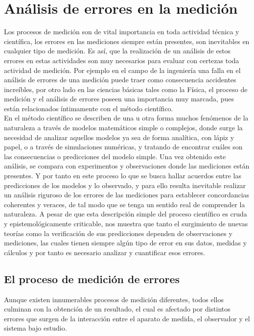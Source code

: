 \chapter{Análisis de errores en la medición}

Los procesos de medición son de vital importancia en toda actividad técnica y científica, los errores en las mediciones siempre 
están presentes, son inevitables en cualquier tipo de medición. Es así, que la realización de un análisis de estos errores en 
estas actividades son muy necesarios para evaluar con certezas toda actividad de medición. Por ejemplo en el campo de la 
ingeniería una falla en el análisis de errores de una medición puede traer como consecuencia accidentes increíbles, por otro lado 
 en las ciencias básicas tales como la Física, el proceso de medición y el análisis de errores poseen una importancia muy 
marcada, pues están relacionados íntimamente con el método científico.\\

En el método científico se describen de una u otra forma muchos fenómenos de la naturaleza a través de modelos matemáticos 
simple o complejos, donde surge la necesidad de analizar aquellos  modelos ya sea de forma analítica, con lápiz y papel, o a 
través de simulaciones numéricas, y tratando de encontrar cuáles son las consecuencias o predicciones del modelo simple. Una vez 
obtenido este análisis, se compara con experimentos y observaciones donde las mediciones están presentes. Y por tanto en este 
proceso lo que se busca hallar acuerdos entre las predicciones de los modelos y lo observado, y para ello resulta inevitable 
realizar un análisis riguroso de los errores de las mediciones para establecer concordancias coherentes y veraces, de tal modo que 
se tenga un sentido real de comprender la naturaleza. A pesar de que esta descripción simple del proceso científico es cruda y 
epistemológicamente criticable, nos muestra que tanto el surgimiento de nuevas teorías como la verificación de sus predicciones 
dependen de observaciones y mediciones, las cuales tienen siempre algún tipo de error en sus datos, medidas y cálculos y por tanto 
es necesario analizar y cuantificar esos errores.

\section{El proceso de medición de errores}

Aunque existen innumerables procesos de medición diferentes, todos ellos culminan con la obtención de un resultado, el cual es 
afectado por distintos errores que surgen de la interacción entre el aparato de medida, el observador y el sistema bajo 
estudio.\\ 

